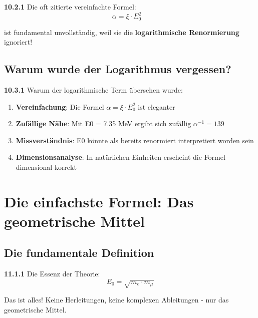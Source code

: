 \documentclass[12pt,a4paper]{article}
\begin{document}
\noindent \textbf{10.2.1} Die oft zitierte vereinfachte Formel:
\begin{equation}
	\boxed{\alpha = \xi \cdot E_0^2} \quad 
\end{equation}

ist fundamental unvollständig, weil sie die \textbf{logarithmische Renormierung} ignoriert!

\subsection{Warum wurde der Logarithmus vergessen?}

\begin{tcolorbox}[colback=yellow!5!white,colframe=orange!75!black,title=Mögliche Gründe]
	\noindent \textbf{10.3.1} Warum der logarithmische Term übersehen wurde:
	\begin{enumerate}
		\item \textbf{Vereinfachung}: Die Formel $\alpha = \xi \cdot E_0^2$ ist eleganter
		\item \textbf{Zufällige Nähe}: Mit E0 = 7.35 MeV ergibt sich zufällig $\alpha^{-1} = 139$
		\item \textbf{Missverständnis}: E0 könnte als bereits renormiert interpretiert worden sein
		\item \textbf{Dimensionsanalyse}: In natürlichen Einheiten erscheint die Formel dimensional korrekt
	\end{enumerate}
\end{tcolorbox}

\section{Die einfachste Formel: Das geometrische Mittel}

\subsection{Die fundamentale Definition}

\begin{tcolorbox}[colback=yellow!10!white,colframe=red!75!black,title=\textbf{DIE EINFACHSTE FORMEL}]
	\noindent \textbf{11.1.1} Die Essenz der Theorie:
	\begin{equation}
		\boxed{E_0 = \sqrt{m_e \cdot m_\mu}}
	\end{equation}
	
	Das ist alles! Keine Herleitungen, keine komplexen Ableitungen - nur das geometrische Mittel.
\end{tcolorbox}
\end{document}
